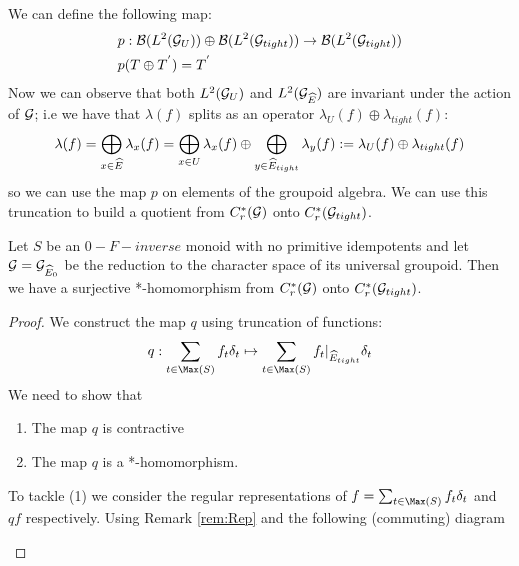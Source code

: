 \begin{corollary}
We can define the following map:
\begin{eqnarray*}\label{eqn:Quotent}
&p:\mathcal{B}(L^{2}(\mathcal{G}_{U})) \oplus\mathcal{B}( L^{2}(\mathcal{G}_{tight})) \rightarrow \mathcal{B}(L^{2}(\mathcal{G}_{tight}))\\
&p(T\oplus T^{'})=T^{'}
\end{eqnarray*}
Now we can observe that both $L^{2}(\mathcal{G}_{U})$ and $L^{2}(\mathcal{G}_{\widehat{E}})$ are invariant under the action of $\mathcal{G}$; i.e we have that $\lambda(f)$ splits as an operator $\lambda_{U}(f)\oplus \lambda_{tight}(f)$:
\begin{equation*}
\lambda(f)=\bigoplus_{x \in \widehat{E}}\lambda_{x}(f)=\bigoplus_{x \in U}\lambda_{x}(f) \oplus \bigoplus_{y \in \widehat{E}_{tight}} \lambda_{y}(f) := \lambda_{U}(f)\oplus \lambda_{tight}(f)
\end{equation*}
so we can use the map $p$ on elements of the groupoid algebra.
We can use this truncation to build a quotient from $C^{*}_{r}(\mathcal{G})$ onto $C^{*}_{r}(\mathcal{G}_{tight})$.

\begin{proposition}\label{prop:P4}
Let $S$ be an $0-F-inverse$ monoid with no primitive idempotents and let $\mathcal{G}=\mathcal{G}_{\widehat{E}_{0}}$ be the reduction to the character space of its universal groupoid. Then we have a surjective *-homomorphism from $C^{*}_{r}(\mathcal{G})$ onto $C^{*}_{r}(\mathcal{G}_{tight})$.
\end{proposition}

\begin{proof}
We construct the map $q$ using truncation of functions:
\begin{equation*}
q: \sum_{t \in \Max(S)} f_{t} \delta_{t} \mapsto \sum_{t \in \Max(S)} f_{t}|_{\E_{tight}} \delta_{t} 
\end{equation*}
We need to show that
\begin{enumerate}
\item The map $q$ is contractive
\item The map $q$ is a *-homomorphism.
\end{enumerate}
To tackle (1) we consider the regular representations of $f = \sum_{t \in \Max(S)} f_{t} \delta_{t}$ and $qf$ respectively. Using Remark \ref{rem:Rep} and the following (commuting) diagram

\begin{center}
\end{center}
\end{proof}
\end{corollary}
